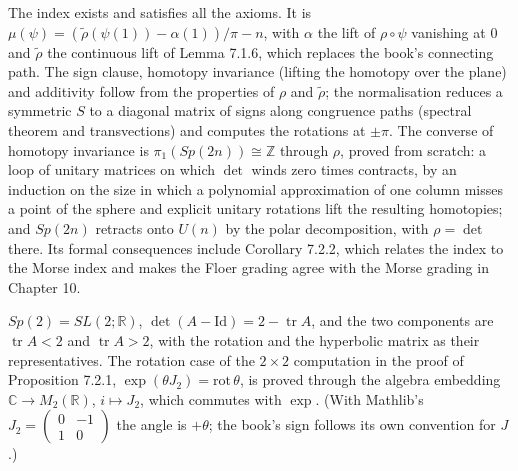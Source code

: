 \begin{definition}
  \label{def:7.2}
  \leanok
  The index exists and satisfies all the axioms.  It is
  $\mu(\psi) = (\tilde\rho(\psi(1)) - \alpha(1))/\pi - n$, with $\alpha$ the lift of
  $\rho\circ\psi$ vanishing at $0$ and $\tilde\rho$ the continuous lift of Lemma 7.1.6,
  which replaces the book's connecting path.  The sign clause, homotopy invariance
  (lifting the homotopy over the plane) and additivity follow from the properties
  of $\rho$ and $\tilde\rho$; the normalisation reduces a symmetric $S$ to a diagonal
  matrix of signs along congruence paths (spectral theorem and transvections)
  and computes the rotations at $\pm\pi$.  The converse of homotopy invariance is
  $\pi_1(Sp(2n)) \cong \mathbb{Z}$ through $\rho$, proved from scratch: a loop of
  unitary matrices on which $\det$ winds zero times contracts, by an induction on
  the size in which a polynomial approximation of one column misses a point of
  the sphere and explicit unitary rotations lift the resulting homotopies; and
  $Sp(2n)$ retracts onto $U(n)$ by the polar decomposition, with $\rho = \det$ there.
  Its formal consequences include Corollary 7.2.2, which relates the index to the
  Morse index and makes the Floer grading agree with the Morse grading in Chapter 10.
\end{definition}

\begin{proposition}
  \label{prop:7.dim2}
  \leanok
  $Sp(2) = SL(2;\mathbb{R})$, $\det(A-\mathrm{Id}) = 2 - \operatorname{tr} A$, and
  the two components are $\operatorname{tr} A < 2$ and $\operatorname{tr} A > 2$,
  with the rotation and the hyperbolic matrix as their representatives.  The
  rotation case of the $2\times 2$ computation in the proof of Proposition 7.2.1,
  $\exp(\theta J_2) = \mathrm{rot}\,\theta$, is proved through the algebra
  embedding $\mathbb{C} \to M_2(\mathbb{R})$, $i \mapsto J_2$, which commutes with
  $\exp$.  (With Mathlib's $J_2 = \begin{pmatrix} 0 & -1 \\ 1 & 0\end{pmatrix}$
  the angle is $+\theta$; the book's sign follows its own convention for $J$.)
\end{proposition}

